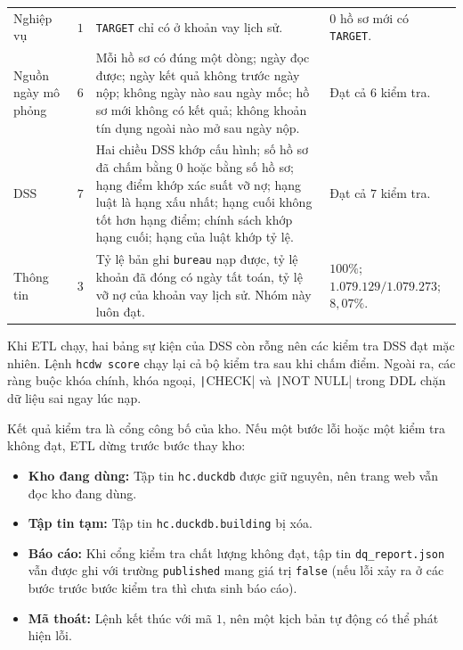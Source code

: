 \begin{table}[H]
\begin{tabular}{p{2.4cm} c p{6.4cm} p{4.6cm}}
		Nghiệp vụ           & $1$                  & \texttt{TARGET} chỉ có ở khoản vay lịch sử.                                                                                                                                                                                   & $0$ hồ sơ mới có \texttt{TARGET}.                              \\
		Nguồn ngày mô phỏng & $6$                  & Mỗi hồ sơ có đúng một dòng; ngày đọc được; ngày kết quả không trước ngày nộp; không ngày nào sau ngày mốc; hồ sơ mới không có kết quả; không khoản tín dụng ngoài nào mở sau ngày nộp.                                        & Đạt cả $6$ kiểm tra.                                           \\
		DSS                 & $7$                  & Hai chiều DSS khớp cấu hình; số hồ sơ đã chấm bằng $0$ hoặc bằng số hồ sơ; hạng điểm khớp xác suất vỡ nợ; hạng luật là hạng xấu nhất; hạng cuối không tốt hơn hạng điểm; chính sách khớp hạng cuối; hạng của luật khớp tỷ lệ. & Đạt cả $7$ kiểm tra.                                           \\
		Thông tin           & $3$                  & Tỷ lệ bản ghi \texttt{bureau} nạp được, tỷ lệ khoản đã đóng có ngày tất toán, tỷ lệ vỡ nợ của khoản vay lịch sử. Nhóm này luôn đạt.                                                                                           & $100\%$; $1.079.129 / 1.079.273$; $8{,}07\%$.                  \\
		\bottomrule
	\end{tabular}
\end{table}

Khi ETL chạy, hai bảng sự kiện của DSS còn rỗng nên các kiểm tra DSS đạt mặc nhiên. Lệnh \texttt{hcdw score} chạy lại cả bộ kiểm tra sau khi chấm điểm. Ngoài ra, các ràng buộc khóa chính, khóa ngoại, \texttt|CHECK| và \texttt|NOT NULL| trong DDL chặn dữ liệu sai ngay lúc nạp.

\medskip

Kết quả kiểm tra là cổng công bố của kho. Nếu một bước lỗi hoặc một kiểm tra không đạt, ETL dừng trước bước thay kho:
\begin{itemize}[topsep=0pt, itemsep=1pt]
	\item \textbf{Kho đang dùng:} Tập tin \texttt{hc.duckdb} được giữ nguyên, nên trang web vẫn đọc kho đang dùng.
	\item \textbf{Tập tin tạm:} Tập tin \texttt{hc.duckdb.building} bị xóa.
	\item \textbf{Báo cáo:} Khi cổng kiểm tra chất lượng không đạt, tập tin \texttt{dq\_report.json} vẫn được ghi với trường \texttt{published} mang giá trị \texttt{false} (nếu lỗi xảy ra ở các bước trước bước kiểm tra thì chưa sinh báo cáo).
	\item \textbf{Mã thoát:} Lệnh kết thúc với mã $1$, nên một kịch bản tự động có thể phát hiện lỗi.
\end{itemize}
\endgroup
